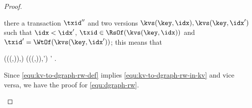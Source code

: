 \begin{toappendix}
\begin{proof}
\begin{enumerate}
    there a transaction \( \txid'' \) and two versions \(\kvs(\key,\idx),\kvs(\key,\idx') \)  such that
    \( \idx < \idx' \), \( \txid \in \RsOf(\kvs(\key,\idx)) \) and \( \txid' = \WtOf(\kvs(\key,\idx')) \);
    this means that 
    \begin{Formulae}
    \begin{Formula}
    (\WtOf(\kvs(\key,\idx)),\txid) \in \WR \land (\WtOf(\kvs(\key,\idx)),\txid') \in \WW \land \txid \neq \txid' .
    \label{equ:kv-to-dgraph-rw-in-kv}
    \end{Formula}
    \end{Formulae}
    Since \cref{equ:kv-to-dgraph-rw-def} implies \cref{equ:kv-to-dgraph-rw-in-kv} and vice versa,
    we have the proof for \cref{equ:dgraph-rw}. \qedhere
\end{enumerate}
\end{proof}
\end{toappendix}
